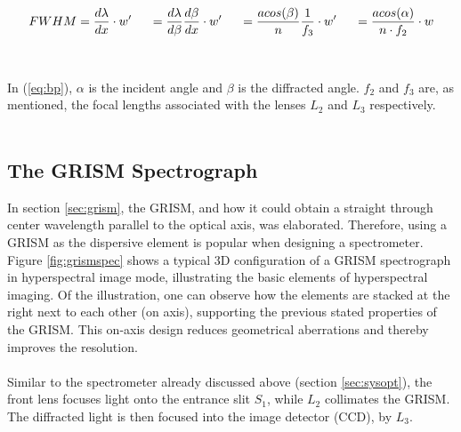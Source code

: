 \begin{equation}
    FWHM = \frac{d\lambda}{dx} \cdot w'\hspace{0.5cm}
    = \frac{d\lambda}{d\beta} \frac{d\beta}{dx}\cdot w' \hspace{0.5cm}
    = \frac{a cos(\beta)}{n} \frac{1}{f_3}\cdot w' \hspace{0.5cm}
    = \frac{a cos(\alpha)}{n\cdot f_2}\cdot w
    \label{eq:bp}
\end{equation}
\\\\
\noindent
In (\ref{eq:bp}), $\alpha$ is the incident angle and $\beta$ is the diffracted angle. $f_2$ and $f_3$ are, as mentioned, the focal lengths associated with the lenses $L_2$ and $L_3$ respectively.
\\\\
\subsection{The GRISM Spectrograph}
In section \ref{sec:grism}, the GRISM, and how it could obtain a straight through center wavelength parallel to the optical axis, was elaborated. Therefore, using a GRISM as the dispersive element is popular when designing a spectrometer. Figure \ref{fig:grismspec} shows a typical 3D configuration of a GRISM spectrograph in hyperspectral image mode, illustrating the basic elements of hyperspectral imaging. Of the illustration, one can observe how the elements are stacked at the right next to each other (on axis), supporting the previous stated properties of the GRISM. This on-axis design reduces geometrical aberrations and thereby improves the resolution. 
\\\\
Similar to the spectrometer already discussed above (section \ref{sec:sysopt}), the front lens focuses light onto the entrance slit $S_1$, while $L_2$ collimates the GRISM. The diffracted light is then focused into the image detector (CCD), by $L_3$. 


